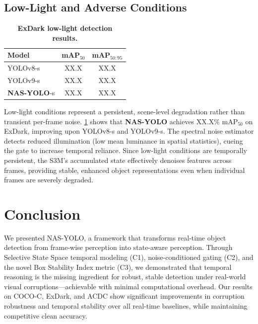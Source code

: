 \documentclass[review]{eccv2026}
\newcommand{\ours}{\textbf{NAS-YOLO}}
\newcommand{\exdarkYoloEightMapFifty}{XX.X}
\newcommand{\exdarkYoloEightMap}{XX.X}
\newcommand{\exdarkYoloNineMapFifty}{XX.X}
\newcommand{\exdarkYoloNineMap}{XX.X}
\newcommand{\exdarkNasSMapFifty}{XX.X}
\newcommand{\exdarkNasSMap}{XX.X}
\begin{document}
\subsection{Low-Light and Adverse Conditions}
\label{sec:lowlight}

\begin{table}[t]
  \centering
  \caption{\textbf{ExDark low-light detection results.}}
  \label{tab:exdark}
  \vspace{4pt}
  \small
  \begin{tabular}{l|cc}
    \toprule
    \textbf{Model} & \textbf{mAP}$_{50}$ & \textbf{mAP}$_{50:95}$ \\
    \midrule
    YOLOv8-s & \exdarkYoloEightMapFifty & \exdarkYoloEightMap \\
    YOLOv9-s & \exdarkYoloNineMapFifty & \exdarkYoloNineMap \\
    \rowcolor{bestcolor} \ours{}-s & \exdarkNasSMapFifty & \exdarkNasSMap \\
    \bottomrule
  \end{tabular}
\end{table}

Low-light conditions represent a persistent, scene-level degradation rather than transient per-frame noise.
\cref{tab:exdark} shows that \ours{} achieves \exdarkNasSMapFifty\% mAP$_{50}$ on ExDark, improving upon YOLOv8-s and YOLOv9-s.
The spectral noise estimator detects reduced illumination (low mean luminance in spatial statistics), cueing the gate to increase temporal reliance.
Since low-light conditions are temporally persistent, the S3M's accumulated state effectively denoises features across frames, providing stable, enhanced object representations even when individual frames are severely degraded.

\section{Conclusion}
\label{sec:conclusion}

We presented NAS-YOLO, a framework that transforms real-time object detection from frame-wise perception into state-aware perception.
Through Selective State Space temporal modeling (C1), noise-conditioned gating (C2), and the novel Box Stability Index metric (C3), we demonstrated that temporal reasoning is the missing ingredient for robust, stable detection under real-world visual corruptions---achievable with minimal computational overhead.
Our results on COCO-C, ExDark, and ACDC show significant improvements in corruption robustness and temporal stability over all real-time baselines, while maintaining competitive clean accuracy.
\end{document}
